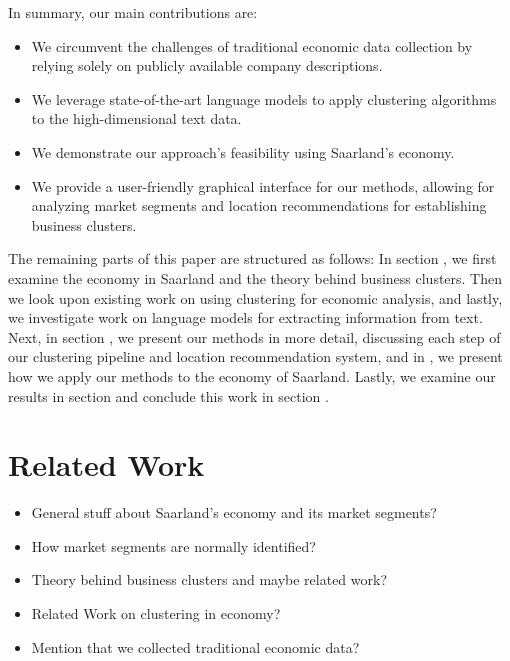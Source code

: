 \documentclass[conference]{IEEEtran}
\begin{document}
In summary, our main contributions are:
\begin{itemize}
    \item We circumvent the challenges of traditional economic data collection by relying solely on publicly available company descriptions.
    \item We leverage state-of-the-art language models to apply clustering algorithms to the high-dimensional text data.
    \item We demonstrate our approach's feasibility using Saarland's economy.
    \item We provide a user-friendly graphical interface for our methods, allowing for analyzing market segments and location recommendations for establishing business clusters.
\end{itemize}

The remaining parts of this paper are structured as follows: In section \MakeUppercase{}, we first examine the economy in Saarland and the theory behind business clusters. Then we look upon existing work on using clustering for economic analysis, and lastly, we investigate work on language models for extracting information from text. Next, in section \MakeUppercase{}, we present our methods in more detail, discussing each step of our clustering pipeline and location recommendation system, and in \MakeUppercase{}, we present how we apply our methods to the economy of Saarland. Lastly, we examine our results in section \MakeUppercase{} and conclude this work in section \MakeUppercase{}.

\section{Related Work}
\color{red}
\begin{itemize}
    \item General stuff about Saarland's economy and its market segments?
    \item How market segments are normally identified?
    \item Theory behind business clusters and maybe related work?
    \item Related Work on clustering in economy?
    \item Mention that we collected traditional economic data?
\end{itemize}
\color{black}
\end{document}
